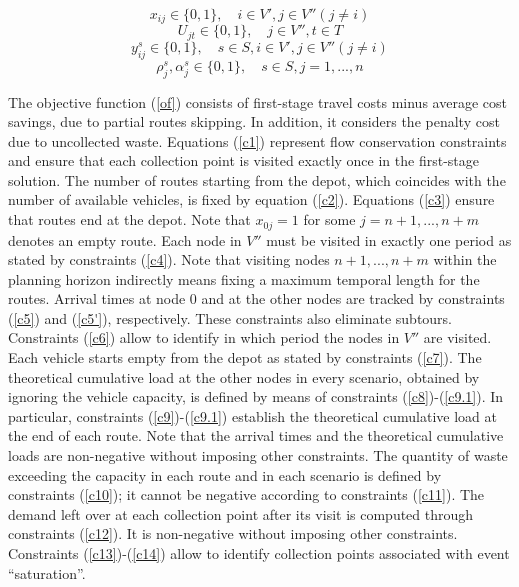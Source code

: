 \documentclass[authoryear,preprint,12pt]{elsarticle}
\begin{document}
%
\begin{equation}\label{c19}
x_{ij} \in \{0,1\}, \quad i \in V', j \in V'' (j\neq i)
\end{equation}
%
\begin{equation}\label{c20}
U_{jt} \in \{0,1\}, \quad j\in V'', t \in T
\end{equation}
%
\begin{equation}\label{c21}
y_{ij}^s \in \{0,1\}, \quad s \in S, i \in V', j \in V'' (j\neq i)
\end{equation}
%
\begin{equation}\label{c22}
\rho_j^s, \alpha_j^s \in \{0,1\}, \quad s \in S, j=1,...,n
\end{equation}

The objective function (\ref{of}) consists of first-stage travel costs minus average cost savings, due to partial routes skipping. In addition, it considers the penalty cost due to uncollected waste.  
Equations (\ref{c1}) represent flow conservation constraints and ensure that each collection point is visited exactly once in the first-stage solution. 
The number of routes starting from the depot, which coincides with the number of available vehicles, is fixed by equation (\ref{c2}). Equations (\ref{c3}) ensure that routes end at the depot. Note that $x_{0j}=1$ for some $j=n+1,...,n+m$ denotes an empty route.   
Each node in $V''$ must be visited in exactly one period as stated by constraints (\ref{c4}). Note that visiting nodes $n+1,...,n+m$ within the planning horizon indirectly means fixing a maximum temporal length for the routes. Arrival times at node 0 and at the other nodes are tracked by constraints  (\ref{c5}) and (\ref{c5'}), respectively. These constraints also eliminate subtours. Constraints  (\ref{c6}) allow to identify in which period the nodes in $V''$ are visited. 
Each vehicle starts empty from the depot as stated by constraints (\ref{c7}).
The theoretical cumulative load at the other nodes in every scenario, obtained by ignoring the vehicle capacity, is defined by means of constraints (\ref{c8})-(\ref{c9.1}). In particular, constraints (\ref{c9})-(\ref{c9.1}) establish the theoretical cumulative load at the end of each route. Note that the arrival times and the theoretical cumulative loads are non-negative without imposing other constraints.
The quantity of waste exceeding the capacity in each route and in each scenario is defined by constraints (\ref{c10}); it cannot be negative according to constraints (\ref{c11}).
The demand left over at each collection point after its visit is computed through constraints (\ref{c12}). It is non-negative without imposing other constraints. Constraints  (\ref{c13})-(\ref{c14}) allow to identify collection points associated with event ``saturation''. 
\end{document}
